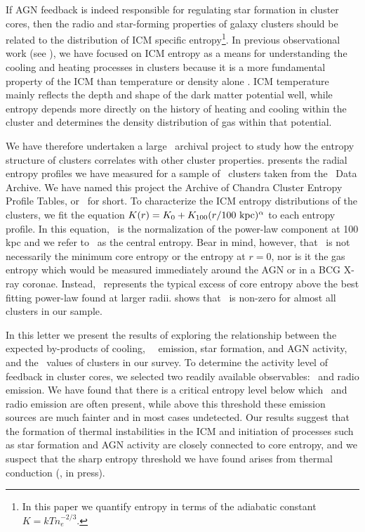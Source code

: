 \documentclass[12pt,preprint]{aastex}
\begin{document}
If AGN feedback is indeed responsible for regulating star formation in
cluster cores, then the radio and star-forming properties of galaxy
clusters should be related to the distribution of ICM specific
entropy\footnote{In this paper we quantify entropy in terms of the
  adiabatic constant $K = kTn_e^{-2/3}$.}. In previous observational
work (see \citealt{radioquiet, d06, accept}), we have focused on ICM
entropy as a means for understanding the cooling and heating processes
in clusters because it is a more fundamental property of the ICM than
temperature or density alone \citep{voitbryan,voitreview}. ICM
temperature mainly reflects the depth and shape of the dark matter
potential well, while entropy depends more directly on the history of
heating and cooling within the cluster and determines the density
distribution of gas within that potential.

We have therefore undertaken a large \Chandra\ archival project to
study how the entropy structure of clusters correlates with other
cluster properties. \cite{accept} presents the radial entropy profiles
we have measured for a sample of \clnum\ clusters taken from the
\Chandra\ Data Archive. We have named this project the Archive of
Chandra Cluster Entropy Profile Tables, or \accept\ for short. To
characterize the ICM entropy distributions of the clusters, we fit the
equation $K(r) = K_0 +K_{100}(r/100 \mbox{\ensuremath{\mathrm{~kpc}}})^{\alpha}$ to each entropy
profile. In this equation, \khun\ is the normalization of the
power-law component at 100 kpc and we refer to \kna\ as the central
entropy. Bear in mind, however, that \kna\ is not necessarily the
minimum core entropy or the entropy at $r=0$, nor is it the gas
entropy which would be measured immediately around the AGN or in a BCG
X-ray coronae. Instead, \kna\ represents the typical excess of core
entropy above the best fitting power-law found at larger
radii. \cite{accept} shows that \kna\ is non-zero for almost all
clusters in our sample.

In this letter we present the results of exploring the relationship
between the expected by-products of cooling, \eg\ \halpha\ emission,
star formation, and AGN activity, and the \kna\ values of clusters in
our survey. To determine the activity level of feedback in cluster
cores, we selected two readily available observables: \halpha\ and
radio emission. We have found that there is a critical entropy level
below which \halpha\ and radio emission are often present, while above
this threshold these emission sources are much fainter and in most
cases undetected. Our results suggest that the formation of thermal
instabilities in the ICM and initiation of processes such as star
formation and AGN activity are closely connected to core entropy, and
we suspect that the sharp entropy threshold we have found arises from
thermal conduction (\citealt{conduction}, in press).
\end{document}
